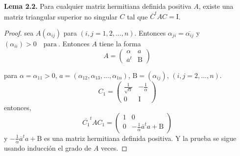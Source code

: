 \documentclass[12pt]{book}
\theoremstyle{definition}
\newcounter{in}
\newcounter{ini}
\begin{document}
\textbf{Lema 2.2.} Para cualquier matriz hermitiana definida positiva
$A$, existe una matriz triangular superior no singular $C$ tal que
$\overline{C}^{t}AC=\mathrm{I}$.
\begin{proof}
  sea $A\left(\alpha_{ij}\right)$ para
  $\left(i,j=1,2,...,n\right)$. Entonces
  $\alpha_{ji}=\overline{\alpha_{ij}}$ y
  $\left(\alpha_{ii}\right)>0 \quad \mathrm{para\ }$. Entonces $A$
  tiene la forma
  \begin{equation}
    \label{eq:2}
     A=
     \begin{pmatrix}
    \alpha & a \\ 
    \overline{a}^{t} & \mathrm{B}
  \end{pmatrix}
  \end{equation} 

para $\alpha=\alpha_{11}>0$,
$ a= \left(\alpha_{12},\alpha_{13},...,\alpha_{1n} \right) $,
$ \mathrm{B}=\left(\alpha_{ij}\right)$, $ \left(i,j=2,...,n\right) $.
\begin{equation}
  \label{eq:3}
  C_{1}=
  \begin{pmatrix}
    \frac{1}{\sqrt{\alpha}} & -\frac{1}{\alpha} \\ 
    0 & \mathrm{I}
  \end{pmatrix}
\end{equation}
entonces, 
\begin{equation}
   \label{eq:4}
  \overline{C_{1}}^{t}AC_{1} =
  \begin{pmatrix}
    1 & 0 \\ 
    0 & -\frac{1}{\alpha}\overline{a}^{t}a+\mathrm{B}
  \end{pmatrix}
\end{equation}  
y $-\frac{1}{\alpha}\overline{a}^{t}a+\mathrm{B}$ es una matriz
hermitiana definida positiva. Y la prueba se sigue usando inducción el
grado de $A$ veces.
\end{proof}
\end{document}
